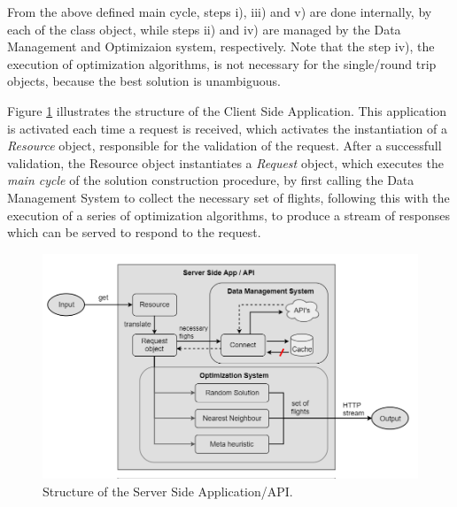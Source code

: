 From the above defined main cycle, steps i), iii) and v) are done internally, by each of the class object, while steps ii) and iv) are managed by the Data Management and Optimizaion system, respectively. Note that the step iv), the execution of optimization algorithms, is not necessary for the single/round trip objects,
because the best solution is unambiguous.

Figure \ref{fig:api_structure} illustrates the structure of the Client Side Application. This application is activated each time a request is received, which activates  the instantiation of a \textit{Resource} object, responsible for the validation of the request. After a successfull validation, the Resource object instantiates a \textit{Request} object, which executes the \textit{main cycle} of the solution construction procedure, by first calling the Data Management System to collect the necessary set of flights, following this with the execution of a series of optimization algorithms, to produce a stream of responses which can be served to respond to the request.

\begin{figure}[htpb]
  \centering
  \includegraphics[width=\textwidth]{./Figures/system_implementation/api_structure.png}
  \caption{Structure of the Server Side Application/API.}
  \label{fig:api_structure}  
\end{figure}